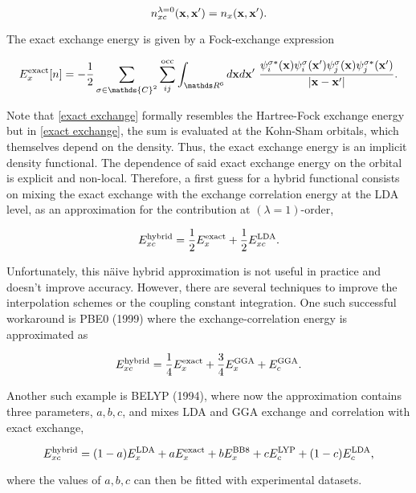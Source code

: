 \documentclass{homework}
\begin{document}
$$
n_{xc}^{\lambda = 0}({\bf x}, {\bf x}') = n_{x}({\bf x}, {\bf x}').
$$

The exact exchange energy is given by a Fock-exchange expression

\begin{equation}
    E_x^{\textnormal{exact}}[n] = -\frac{1}{2} \sum_{\sigma \in \mathds{C}^2} \sum_{ij}^{\textnormal{occ}} \int_{\R^6} d\x d\x' \blanky \frac{\psi_{i}^{\sigma {*}} (\x) \psi_{i}^{\sigma} (\x') \psi_{j}^{\sigma} (\x) \psi_{j}^{\sigma {*}} (\x')}{|\x - \x'|}.
    \label{exact exchange}
\end{equation}

Note that \eqref{exact exchange} formally resembles the Hartree-Fock exchange energy but in \eqref{exact exchange}, the sum is evaluated at the Kohn-Sham orbitals, which themselves depend on the density. Thus, the exact exchange energy is an implicit density functional. The dependence of said exact exchange energy on the orbital is explicit and non-local. Therefore, a first guess for a hybrid functional consists on mixing the exact exchange with the exchange correlation energy at the LDA level, as an approximation for the contribution at $(\lambda=1)$-order,

\begin{equation}
    E_{xc}^{\textnormal{hybrid}} = \frac{1}{2}    E_{x}^{\textnormal{exact}} + \frac{1}{2}    E_{xc}^{\textnormal{LDA}}.
    \label{naive hybrid}
\end{equation}

Unfortunately, this n\"aive hybrid approximation is not useful in practice and doesn't improve accuracy. However, there are several techniques to improve the interpolation schemes or the coupling constant integration. One such successful workaround is PBE0 (1999) where the exchange-correlation energy is approximated as 

$$
    E_{xc}^{\textnormal{hybrid}} = \frac{1}{4}    E_{x}^{\textnormal{exact}} + \frac{3}{4}    E_{x}^{\textnormal{GGA}} + E_{c}^{\textnormal{GGA}}.
$$

Another such example is BELYP (1994), where now the approximation contains three parameters, $a, b, c$, and mixes LDA and GGA exchange and correlation with exact exchange, 

$$
    E_{xc}^{\textnormal{hybrid}} = (1-a)    E_{x}^{\textnormal{LDA}} + aE_{x}^{\textnormal{exact}} + bE_{x}^{\textnormal{BB8}} + cE_{c}^{\textnormal{LYP}} + (1-c)E_{c}^{\textnormal{LDA}},
$$

where the values of $a,b,c$ can then be fitted with experimental datasets. \\
\end{document}
